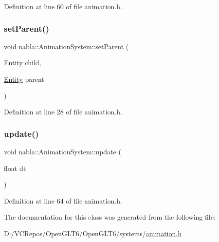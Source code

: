 Definition at line 60 of file animation.\+h.

\mbox{\label{classnabla_1_1_animation_system_a11a13061b373dde465d20615b35535a0}} 
\subsubsection{\texorpdfstring{setParent()}{setParent()}}
{\footnotesize\ttfamily void nabla\+::\+Animation\+System\+::set\+Parent (\begin{DoxyParamCaption}\item[{\mbox{\hyperlink{structnabla_1_1_entity}{Entity}}}]{child,  }\item[{\mbox{\hyperlink{structnabla_1_1_entity}{Entity}}}]{parent }\end{DoxyParamCaption})\hspace{0.3cm}{\ttfamily [inline]}}



Definition at line 28 of file animation.\+h.

\mbox{\label{classnabla_1_1_animation_system_ac5231e59d5e026f305e574b0dc5e9d78}} 
\subsubsection{\texorpdfstring{update()}{update()}}
{\footnotesize\ttfamily void nabla\+::\+Animation\+System\+::update (\begin{DoxyParamCaption}\item[{float}]{dt }\end{DoxyParamCaption})\hspace{0.3cm}{\ttfamily [inline]}}



Definition at line 64 of file animation.\+h.



The documentation for this class was generated from the following file\+:\begin{DoxyCompactItemize}
\item 
D\+:/\+V\+C\+Repos/\+Open\+G\+L\+T6/\+Open\+G\+L\+T6/systems/\mbox{\hyperlink{animation_8h}{animation.\+h}}\end{DoxyCompactItemize}
